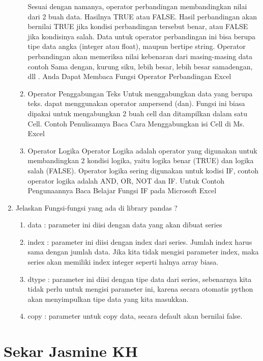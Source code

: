 \begin{enumerate}
\begin{enumerate}
Sesuai dengan namanya, operator perbandingan membandingkan nilai dari 2 buah data. Hasilnya TRUE atau FALSE. Hasil perbandingan akan bernilai TRUE jika kondisi perbandingan tersebut benar, atau FALSE jika kondisinya salah. Data untuk operator perbandingan ini bisa berupa tipe data angka (integer atau float), maupun bertipe string. Operator perbandingan akan memeriksa nilai kebenaran dari masing-masing data contoh Sama dengan, kurung siku, lebih besar, lebih besar samadengan,  dll . Anda Dapat Membaca Fungsi Operator Perbandingan Excel
\item Operator Penggabungan Teks
Untuk menggabungkan data yang berupa teks. dapat menggunakan operator ampersend (dan). Fungsi ini biasa dipakai untuk mengabungkan 2 buah cell dan ditampilkan dalam satu Cell. Contoh Penulisannya Baca Cara Menggabungkan isi Cell di Ms. Excel
\item Operator Logika
Operator Logika adalah operator yang digunakan untuk membandingkan 2 kondisi logika, yaitu logika benar (TRUE) dan logika salah (FALSE). Operator logika sering digunakan untuk kodisi IF, contoh operator logika adalah  AND, OR, NOT dan IF. Untuk Contoh Pengunaannya Baca Belajar Fungsi IF pada Microsoft Excel
\end{enumerate}
\item Jelaskan Fungsi-fungsi yang ada di library pandas ?
\begin{enumerate}
\item data : parameter ini diisi dengan data yang akan dibuat series
\item index : parameter ini diisi dengan index dari series. Jumlah index harus sama dengan jumlah data. Jika kita tidak mengisi parameter index, maka series akan memiliki index integer seperti halnya array biasa.
\item dtype : parameter ini diisi dengan tipe data dari series, sebenarnya kita tidak perlu untuk mengisi parameter ini, karena secara otomatis python akan menyimpulkan tipe data yang kita masukkan.
\item copy : parameter untuk copy data, secara default akan bernilai false.

\end{enumerate}



\end{enumerate}

\section{Sekar Jasmine KH}

